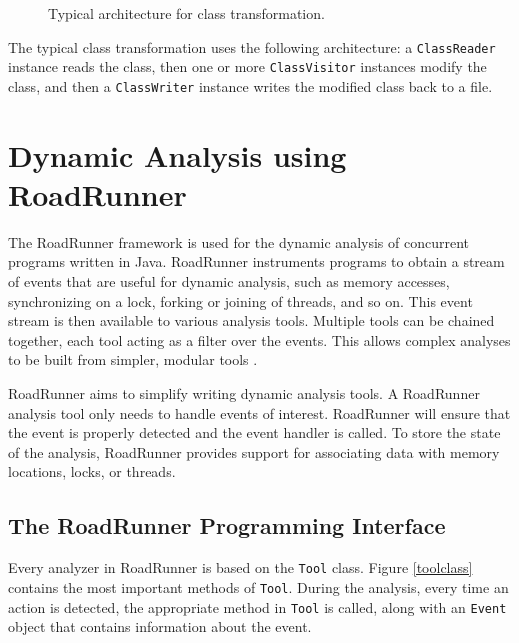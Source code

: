 \begin{figure}[hbt]
    
    \caption{Typical architecture for class transformation.}
\end{figure}

The typical class transformation uses the following architecture: a
\texttt{ClassReader} instance reads the class, then one or more
\texttt{ClassVisitor} instances modify the class, and then a
\texttt{ClassWriter} instance writes the modified class back to a file.

\section{Dynamic Analysis using RoadRunner}

The RoadRunner framework is used for the dynamic analysis of concurrent programs
written in Java. RoadRunner instruments programs to obtain a stream of events
that are useful for dynamic analysis, such as memory accesses, synchronizing on
a lock, forking or joining of threads, and so on. This event stream is then
available to various analysis tools. Multiple tools can be chained together,
each tool acting as a filter over the events. This allows complex analyses to be
built from simpler, modular tools \cite{RoadRunner}.

RoadRunner aims to simplify writing dynamic analysis tools. A RoadRunner
analysis tool only needs to handle events of interest. RoadRunner will ensure
that the event is properly detected and the event handler is called. To store
the state of the analysis, RoadRunner provides support for associating data with
memory locations, locks, or threads.


\subsection{The RoadRunner Programming Interface}

Every analyzer in RoadRunner is based on the \texttt{Tool} class. Figure
\ref{toolclass} contains the most important methods of \texttt{Tool}. During the
analysis, every time an action is detected, the appropriate method in
\texttt{Tool} is called, along with an \texttt{Event} object that contains
information about the event.

